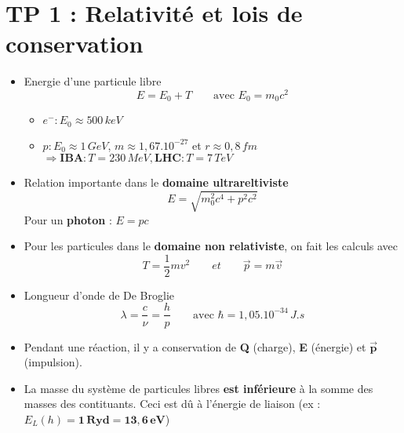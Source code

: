 \section*{TP 1 : Relativité et lois de conservation}

\begin{itemize}
	\item Energie d'une particule libre 
	      \begin{equation}
	      	E = E_0 + T \qquad \mbox{avec } E_0 = m_0 c^2
	      \end{equation}
	      \begin{itemize}
	      	\item $e^- : E_0 \approx 500 \, keV$
	      	\item $p : E_0 \approx 1\, GeV$, $m \approx 1,67 .10^{-27}$ et $r \approx 0,8 \, fm$ \\
	      	      $\Rightarrow \mathbf{IBA} : T = 230 \, MeV, \mathbf{LHC} : T = 7 \, TeV$
	      \end{itemize}
	      		
	\item Relation importante dans le \textbf{domaine ultrareltiviste}
	      \begin{equation}
	      	E = \sqrt{m_0^2c^4 + p^2c^2}
	      \end{equation}
	      Pour un \textbf{photon} : $E = pc$
	      	
	\item Pour les particules dans le \textbf{domaine non relativiste}, on fait les calculs avec
	      \begin{equation}
	      	T = \frac{1}{2}mv^2 \qquad et \qquad \vec{p} = m \vec{v}
	      \end{equation}
	      		
	\item Longueur d'onde de De Broglie 
	      \begin{equation}
	      	\lambda = \frac{c}{\nu} = \frac{h}{p} \qquad \mbox{avec } \hbar = 1,05 . 10^{-34}\, J.s
	      \end{equation}
	\item Pendant une réaction, il y a conservation de \textbf{Q} (charge), \textbf{E} (énergie) et $\vec{\mathbf{p}}$ (impulsion).
	      	
	\item La masse du système de particules libres \textbf{est inférieure} à la somme des masses des contituants. Ceci est dû à l'énergie de liaison (ex : $E_L(h) = \mathbf{1 \, Ryd = 13,6 \, eV}$)
\end{itemize}